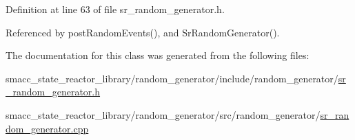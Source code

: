 Definition at line 63 of file sr\+\_\+random\+\_\+generator.\+h.



Referenced by post\+Random\+Events(), and Sr\+Random\+Generator().



The documentation for this class was generated from the following files\+:\begin{DoxyCompactItemize}
\item 
smacc\+\_\+state\+\_\+reactor\+\_\+library/random\+\_\+generator/include/random\+\_\+generator/\hyperlink{sr__random__generator_8h}{sr\+\_\+random\+\_\+generator.\+h}\item 
smacc\+\_\+state\+\_\+reactor\+\_\+library/random\+\_\+generator/src/random\+\_\+generator/\hyperlink{sr__random__generator_8cpp}{sr\+\_\+random\+\_\+generator.\+cpp}\end{DoxyCompactItemize}
